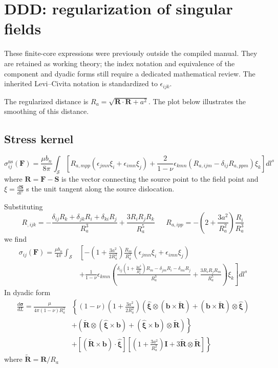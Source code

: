 \chapter{DDD: regularization of singular fields}
\begin{draftnote}
These finite-core expressions were previously outside the compiled manual. They are retained as working theory; the index notation and equivalence of the component and dyadic forms still require a dedicated mathematical review. The inherited Levi--Civita notation is standardized to $\epsilon_{ijk}$.
\end{draftnote}
The regularized distance is $R_a=\sqrt{\bm R\cdot\bm R+a^2}$. The plot below illustrates the smoothing of this distance.
\section{Stress kernel}
\begin{equation}
\sigma^\text{ns}_{ij}(\bm F)=\frac{\mu b_n}{8\pi}\int_\mathcal{S} \left[R_{a,mpp}\left(\epsilon_{jmn}\xi_i+\epsilon_{imn}\xi_j\right)+\frac{2}{1-\nu}\epsilon_{kmn}\left(R_{a,ijm}-\delta_{ij}R_{a,ppm}\right)\xi_k\right]dl^s
\end{equation}
where $\bm R=\bm F-\bm S$ is the vector connecting the source point to the field point and $\xi=\frac{d\bm S}{dl^s}$ s the unit tangent along the source dislocation. 

Substituting 
\begin{equation}
R_{,ijk}=-\frac{\delta_{ij}R_k+\delta_{jk}R_i+\delta_{ki}R_j}{R_a^3}+\frac{3R_iR_jR_k}{R_a^5} \ \ \ \ \ \ \    R_{a,ipp}=-\left(2+\frac{3a^2}{R_a^2}\right)\frac{R_i}{R_a^3}
\end{equation}
we find
\begin{equation}
\begin{split}
\sigma_{ij}(\bm F)=\frac{\mu b_n}{4\pi}\int_\mathcal{S} &\left[-\left(1+\frac{3a^2}{2R_a^2}\right)\frac{R_m}{R_a^3}\left(\epsilon_{jmn}\xi_i+\epsilon_{imn}\xi_j\right)\right.
\\ &\left.+\frac{1}{1-\nu}\epsilon_{kmn}\left(\frac{\delta_{ij}\left(1+\frac{3a^2}{R_a^2}\right)R_m-\delta_{jm}R_i-\delta_{mi}R_j}{R_a^3}+\frac{3R_iR_jR_m}{R_a^5}\right)\xi_k\right]dl^s
\end{split}
\end{equation}
In dyadic form
\begin{align}
\frac{d\bm \sigma}{d L}=\frac{\mu }{4\pi (1-\nu)R_a^2}&\left\{(1-\nu)\left(1+\frac{3a^2}{2R_a^2}\right)\left(\hat{\bm\xi}\otimes (\bm b\times \tilde{\bm R})+ (\bm b\times \tilde{\bm R})\otimes\hat{\bm\xi}\right)\right.\nonumber\\
&\left.+\left(\tilde{\bm R}\otimes(\hat{\bm\xi}\times\bm b)+(\hat{\bm\xi}\times\bm b)\otimes \tilde{\bm R}\right)\right\}\nonumber\\
%
&\left.+[(\tilde{\bm R}\times\bm b)\cdot\hat{\bm \xi}]\left[\left(1+\frac{3a^2}{R_a^2}\right)\bm I+3\tilde{\bm R}\otimes \tilde {\bm R}\right]\right\}
\end{align}
where $\tilde{\bm R}=\bm R/R_a$
